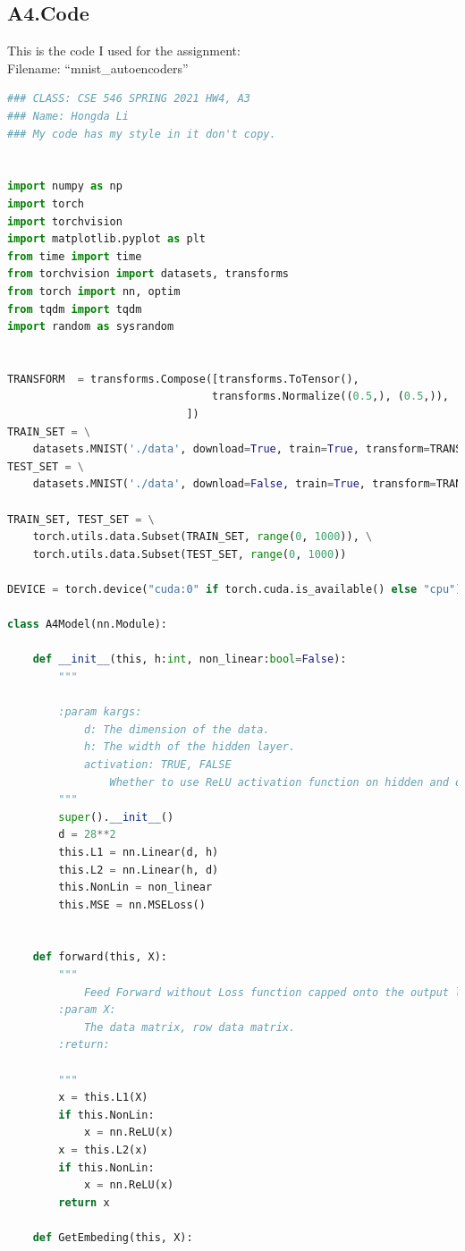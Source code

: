 \documentclass[]{article}
\begin{document}
    \subsection*{A4.Code}\label{A4.Code}
    This is the code I used for the assignment: 
    \\
    Filename: ``mnist\_autoencoders''
        \begin{lstlisting}[language=python]
### CLASS: CSE 546 SPRING 2021 HW4, A3
### Name: Hongda Li
### My code has my style in it don't copy.


import numpy as np
import torch
import torchvision
import matplotlib.pyplot as plt
from time import time
from torchvision import datasets, transforms
from torch import nn, optim
from tqdm import tqdm
import random as sysrandom


TRANSFORM  = transforms.Compose([transforms.ToTensor(),
                                transforms.Normalize((0.5,), (0.5,)),
                            ])
TRAIN_SET = \
    datasets.MNIST('./data', download=True, train=True, transform=TRANSFORM)
TEST_SET = \
    datasets.MNIST('./data', download=False, train=True, transform=TRANSFORM)

TRAIN_SET, TEST_SET = \
    torch.utils.data.Subset(TRAIN_SET, range(0, 1000)), \
    torch.utils.data.Subset(TEST_SET, range(0, 1000))

DEVICE = torch.device("cuda:0" if torch.cuda.is_available() else "cpu")

class A4Model(nn.Module):

    def __init__(this, h:int, non_linear:bool=False):
        """

        :param kargs:
            d: The dimension of the data.
            h: The width of the hidden layer.
            activation: TRUE, FALSE
                Whether to use ReLU activation function on hidden and output layer.
        """
        super().__init__()
        d = 28**2
        this.L1 = nn.Linear(d, h)
        this.L2 = nn.Linear(h, d)
        this.NonLin = non_linear
        this.MSE = nn.MSELoss()


    def forward(this, X):
        """
            Feed Forward without Loss function capped onto the output layer.
        :param X:
            The data matrix, row data matrix.
        :return:

        """
        x = this.L1(X)
        if this.NonLin:
            x = nn.ReLU(x)
        x = this.L2(x)
        if this.NonLin:
            x = nn.ReLU(x)
        return x

    def GetEmbeding(this, X):


\end{lstlisting}
\end{document}

